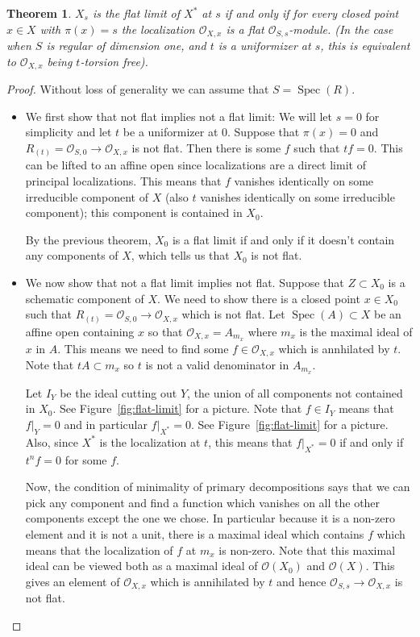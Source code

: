 \documentclass[12pt]{article}
\numberwithin{equation}{section}
\newtheorem{theorem}{Theorem}[subsection]
\theoremstyle{definition}
\theoremstyle{remark}
\newcommand{\Ocal}{\mathcal{O}}
\newcommand{\Spec}{\operatorname{Spec}}
\begin{document}
\begin{theorem}
	$X_s$ is the flat limit of $X^*$ at $s$ if and only if for every closed point $x \in X$ with $\pi(x)=s$ the localization $\Ocal_{X,x}$ is a flat $\Ocal_{S,s}$-module. (In the case when $S$ is regular of dimension one, and $t$ is a uniformizer at $s$, this is equivalent to $\Ocal_{X,x}$ being $t$-torsion free).
\end{theorem}
\begin{proof}
Without loss of generality we can assume that $S = \Spec(R)$. 
\begin{itemize}
	\item We first show that not flat implies not a flat limit:
		We will let $s=0$ for simplicity and let $t$ be a uniformizer at $0$. 
	Suppose that $\pi(x)=0$ and $R_{(t)} = \Ocal_{S,0} \to \Ocal_{X,x}$ is not flat. 
	Then there is some $f$ such that $tf=0$. 
	This can be lifted to an affine open since localizations are a direct limit of principal localizations. 
	This means that $f$ vanishes identically on some irreducible component of $X$ (also $t$ vanishes identically on some irreducible component); this component is contained in $X_0$. 
	
	By the previous theorem, $X_0$ is a flat limit if and only if it doesn't contain any components of $X$, which tells us that $X_0$ is not flat.  
	
	\item We now show that not a flat limit implies not flat. 
	Suppose  that $Z \subset X_0$ is a schematic component of $X$. 
	We need to show there is a closed point $x \in X_0$ such that $R_{(t)} =\Ocal_{S,0} \to \Ocal_{X,x}$ which is not flat. 
	Let $\Spec(A)\subset X$ be an affine open containing $x$ so that $\Ocal_{X,x} = A_{m_x}$ where $m_x$ is the maximal ideal of $x$ in $A$.
	This means we need to find some $f \in \Ocal_{X,x}$ which is annhilated by $t$.
	Note that $tA \subset m_x$ so $t$ is not a valid denominator in $A_{m_x}$.
	
	Let $I_Y$ be the ideal cutting out $Y$, the union of all components not contained in $X_0$. See Figure~\ref{fig:flat-limit} for a picture.
	Note that $f \in I_Y$ means that $f \vert_Y=0$ and in particular $f\vert_{X^*}=0$.
	See Figure~\ref{fig:flat-limit} for a picture. 
	Also, since $X^*$ is the localization at $t$, this means that $f\vert_{X^*}=0$ if and only if $t^nf =0$ for some $f$. 
	
	Now, the condition of minimality of primary decompositions says that we can pick any component and find a function which vanishes on all the other components except the one we chose. 
	In particular because it is a non-zero element and it is not a unit, there is a maximal ideal which contains $f$ which means that the localization of $f$ at $m_x$ is non-zero.
	Note that this maximal ideal can be viewed both as a maximal ideal of $\Ocal(X_0)$ and $\Ocal(X)$.
	This gives an element of $\Ocal_{X,x}$ which is annihilated by $t$ and hence $\Ocal_{S,s} \to \Ocal_{X,x}$ is not flat.
\end{itemize}


\end{proof}
\end{document}
